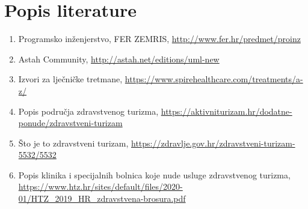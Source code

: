 \chapter*{Popis literature}
		
		\begin{enumerate}
			\item  Programsko inženjerstvo, FER ZEMRIS, \url{http://www.fer.hr/predmet/proinz}
			
			\item  Astah Community, \url{http://astah.net/editions/uml-new}
			
			\item  Izvori za lječničke tretmane, \url{https://www.spirehealthcare.com/treatments/a-z/}
			
			\item Popis područja zdravstvenog turizma, \url{https://aktivniturizam.hr/dodatne-ponude/zdravstveni-turizam}
			
			\item Što je to zdravstveni turizam, \url{https://zdravlje.gov.hr/zdravstveni-turizam-5532/5532}
			
			\item Popis klinika i specijalnih bolnica koje nude usluge zdravstvenog turizma, \url{https://www.htz.hr/sites/default/files/2020-01/HTZ_2019_HR_zdravstvena-brosura.pdf}
		\end{enumerate}